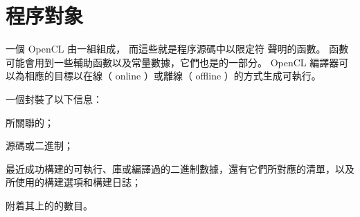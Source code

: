 \section{程序對象}

一個 OpenCL 由一組組成，
而這些就是程序源碼中以限定符  聲明的函數。
  函數可能會用到一些輔助函數以及常量數據，它們也是的一部分。
 OpenCL 編譯器可以為相應的目標以{\ftEmp 在線}（ {\ftEmp online} ）或{\ftEmp 離線}（ {\ftEmp offline} ）的方式生成可執行。

一個封裝了以下信息：
\startigBase
\item 所關聯的；
\item {}源碼或二進制；
\item 最近成功構建的可執行、庫或編譯過的二進制數據，還有它們所對應的清單，以及所使用的構建選項和構建日誌；
\item 附着其上的的數目。
\stopigBase





